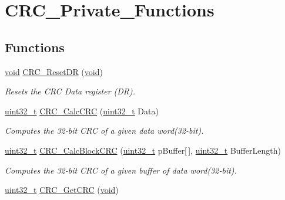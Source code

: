\hypertarget{group___c_r_c___private___functions}{}\section{C\+R\+C\+\_\+\+Private\+\_\+\+Functions}
\label{group___c_r_c___private___functions}
\subsection*{Functions}
\begin{DoxyCompactItemize}
\item 
\hyperlink{usb__devapi_8h_afabf60e7f57651d6d595a02c75f07cd0}{void} \hyperlink{group___c_r_c___private___functions_ga506467d5ef873a5a4ade4ae83cb110f6}{C\+R\+C\+\_\+\+Reset\+DR} (\hyperlink{usb__devapi_8h_afabf60e7f57651d6d595a02c75f07cd0}{void})
\begin{DoxyCompactList}\small\item\em Resets the C\+RC Data register (DR). \end{DoxyCompactList}\item 
\hyperlink{_p_e___types_8h_a33594304e786b158f3fb30289278f5af}{uint32\+\_\+t} \hyperlink{group___c_r_c___private___functions_ga5407fdbb8e8c9be6322cc8856ae5db3b}{C\+R\+C\+\_\+\+Calc\+C\+RC} (\hyperlink{_p_e___types_8h_a33594304e786b158f3fb30289278f5af}{uint32\+\_\+t} Data)
\begin{DoxyCompactList}\small\item\em Computes the 32-\/bit C\+RC of a given data word(32-\/bit). \end{DoxyCompactList}\item 
\hyperlink{_p_e___types_8h_a33594304e786b158f3fb30289278f5af}{uint32\+\_\+t} \hyperlink{group___c_r_c___private___functions_gab15ebf620615c360048fb4f45b15fae6}{C\+R\+C\+\_\+\+Calc\+Block\+C\+RC} (\hyperlink{_p_e___types_8h_a33594304e786b158f3fb30289278f5af}{uint32\+\_\+t} p\+Buffer\mbox{[}$\,$\mbox{]}, \hyperlink{_p_e___types_8h_a33594304e786b158f3fb30289278f5af}{uint32\+\_\+t} Buffer\+Length)
\begin{DoxyCompactList}\small\item\em Computes the 32-\/bit C\+RC of a given buffer of data word(32-\/bit). \end{DoxyCompactList}\item 
\hyperlink{_p_e___types_8h_a33594304e786b158f3fb30289278f5af}{uint32\+\_\+t} \hyperlink{group___c_r_c___private___functions_gab62db4561b0558f3c8ed53887fe7de8b}{C\+R\+C\+\_\+\+Get\+C\+RC} (\hyperlink{usb__devapi_8h_afabf60e7f57651d6d595a02c75f07cd0}{void})

\end{DoxyCompactItemize}
